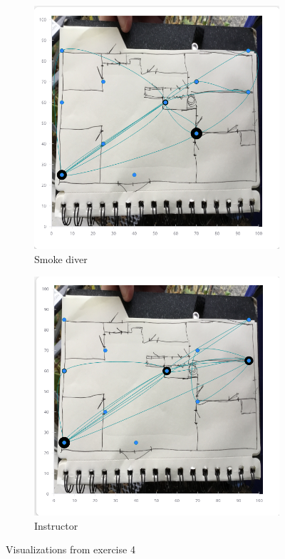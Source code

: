 \documentclass[../Main/thesis.tex]{subfiles}
\begin{document}
\begin{figure}[h]
	\centering
	\begin{subfigure}{0.45\textwidth}
		\includegraphics[width=\textwidth]{../fig/eval_4_1}
		\caption{Smoke diver}
		\label{fig:eval-visualization-4-1-app}
	\end{subfigure}
	\begin{subfigure}{0.45\textwidth}
		\includegraphics[width=\textwidth]{../fig/eval_4_2}
		\caption{Instructor}
		\label{fig:eval-visualization-4-2-app}
	\end{subfigure}
	\caption{Visualizations from exercise 4}
	\label{fig:eval-visualization-4-app}
\end{figure}
\end{document}
